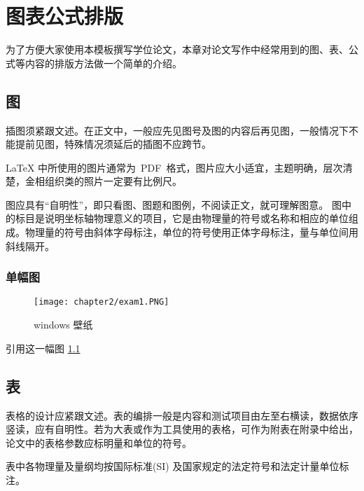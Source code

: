 \cleardoublepage
\chapter{图表公式排版}%

为了方便大家使用本模板撰写学位论文，本章对论文写作中经常用到的{\hei 图、表、公式}等内容的排版方法做一个简单的介绍。

\section{图}%

插图须紧跟文述。在正文中，一般应先见图号及图的内容后再见图，一般情况下不能提前见图，特殊情况须延后的插图不应跨节。

\LaTeX{} 中所使用的图片通常为~PDF~格式，图片应大小适宜，主题明确，层次清楚，金相组织类的照片一定要有比例尺。

图应具有“自明性”，即只看图、图题和图例，不阅读正文，就可理解图意。
图中的标目是说明坐标轴物理意义的项目，它是由物理量的符号或名称和相应的单位组成。物理量的符号由斜体字母标注，单位的符号使用正体字母标注，量与单位间用斜线隔开。
\subsection{单幅图}%

\begin{figure}[!ht]
	\centering
	\texttt{[image: chapter2/exam1.PNG]}
	\caption{windows 壁纸} \label{fig:wallpaperOfWindows}
\end{figure}

引用这一幅图 \ref{fig:wallpaperOfWindows}

\section{表}%

表格的设计应紧跟文述。表的编排一般是内容和测试项目由左至右横读，数据依序竖读，应有自明性。若为大表或作为工具使用的表格，可作为附表在附录中给出，论文中的表格参数应标明量和单位的符号。

表中各物理量及量纲均按国际标准(SI) 及国家规定的法定符号和法定计量单位标注。

